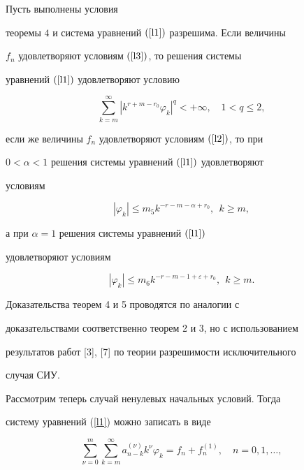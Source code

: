 \begin{thm}


Пусть выполнены условия


теоремы $4$ и система уравнений $(\ref{l1})$ разрешима. Если величины


$f_n$ удовлетворяют условиям $(\ref{l3})$, то решения системы


уравнений $(\ref{l1})$ удовлетворяют условию


$$


\sum_{k=m}^{\infty} |k^{r+m-r_0}\varphi_k|^q < +\infty,\quad


1<q\leqslant 2,


$$


если же величины $f_n$ удовлетворяют условиям $(\ref{l2})$, то при


$0<\alpha<1$ решения системы уравнений $(\ref{l1})$ удовлетворяют


условиям


$$


|\varphi_k|\leqslant m_5 k^{-r-m-\alpha+r_0}, \ \ k\geqslant m,


$$


а при  $\alpha=1$ решения системы уравнений $(\ref{l1})$


удовлетворяют условиям


$$


|\varphi_k|\leqslant m_6 k^{-r-m-1+\varepsilon+r_0}, \ \ k\geqslant m.


$$


\end{thm}





Доказательства теорем 4 и 5 проводятся по аналогии с


доказательствами соответственно теорем 2 и 3, но с использованием


результатов работ [3], [7] по теории разрешимости исключительного


случая СИУ.





Рассмотрим теперь случай ненулевых начальных условий. Тогда


систему уравнений (\ref{l1}) можно записать в виде


\begin{equation} \label{l26}


\sum_{\nu=0}^{m}\sum_{k=m}^{\infty}


a_{n-k}^{(\nu)}k^{\nu}\varphi_k= f_n+f_n^{(1)},\quad n=0,1,\dotsc,


\end{equation}


